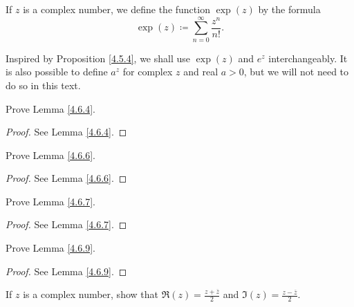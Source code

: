 \begin{definition}\label{4.6.15}
    If \(z\) is a complex number, we define the function \(\exp(z)\) by the formula
    \[
        \exp(z) \coloneqq \sum_{n = 0}^\infty \frac{z^n}{n!}.
    \]
\end{definition}

\begin{note}
    Inspired by Proposition \ref{4.5.4}, we shall use \(\exp(z)\) and \(e^z\) interchangeably.
    It is also possible to define \(a^z\) for complex \(z\) and real \(a > 0\), but we will not need to do so in this text.
\end{note}

\exercisesection

\begin{exercise}\label{ex 4.6.1}
    Prove Lemma \ref{4.6.4}.
\end{exercise}

\begin{proof}
    See Lemma \ref{4.6.4}.
\end{proof}

\begin{exercise}\label{ex 4.6.2}
    Prove Lemma \ref{4.6.6}.
\end{exercise}

\begin{proof}
    See Lemma \ref{4.6.6}.
\end{proof}

\begin{exercise}\label{ex 4.6.3}
    Prove Lemma \ref{4.6.7}.
\end{exercise}

\begin{proof}
    See Lemma \ref{4.6.7}.
\end{proof}

\begin{exercise}\label{ex 4.6.4}
    Prove Lemma \ref{4.6.9}.
\end{exercise}

\begin{proof}
    See Lemma \ref{4.6.9}.
\end{proof}

\begin{exercise}\label{ex 4.6.5}
    If \(z\) is a complex number, show that \(\Re(z) = \frac{z + \overline{z}}{2}\) and \(\Im(z) = \frac{z - \overline{z}}{2}\).
\end{exercise}

